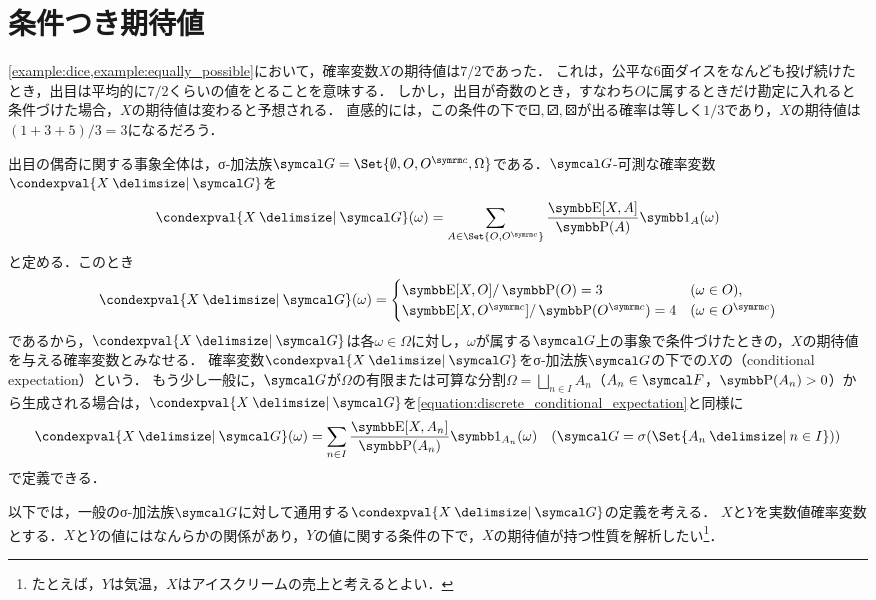 \documentclass[../../main]{subfiles}
\begin{document}
\section{条件つき期待値}

\cref{example:dice,example:equally_possible}において，確率変数\(X\)の期待値は\(7/2\)であった．
これは，公平な6面ダイスをなんども投げ続けたとき，出目は平均的に\(7/2\)くらいの値をとることを意味する．
しかし，出目が奇数のとき，すなわち\(O\)に属するときだけ勘定に入れると条件づけた場合，\(X\)の期待値は変わると予想される．
直感的には，この条件の下で\(\dicei,\diceiii,\dicev\)が出る確率は等しく\(1/3\)であり，\(X\)の期待値は\((1+3+5)/3=3\)になるだろう．

出目の偶奇に関する事象全体は，σ‐加法族\(\sigmaalg{G}=\Set{\emptyset,O,\scomp{O},\Omega}\)である．\(\sigmaalg{G}\)‐可測な確率変数\(\condexpval{X\given\sigmaalg{G}}\)を
\begin{equation}
  \label{equation:discrete_conditional_expectation}
  \condexpval{X\given\sigmaalg{G}}(\omega) = \sum_{A\in\Set{O,\scomp{O}}}\frac{\expval[X,A]}{\prob(A)}\indicator_A(\omega)
\end{equation}
と定める．このとき
\[
  \condexpval{X\given\sigmaalg{G}}(\omega) = \begin{cases}\expval[X,O]/\prob(O) = 3 & (\omega\in O),\\ \expval[X,\scomp{O}]/\prob(\scomp{O}) = 4 & (\omega\in\scomp{O})\end{cases}
\]
であるから，\(\condexpval{X\given\sigmaalg{G}}\)は各\(\omega\in\Omega\)に対し，\(\omega\)が属する\(\sigmaalg{G}\)上の事象で条件づけたときの，\(X\)の期待値を与える確率変数とみなせる．
確率変数\(\condexpval{X\given\sigmaalg{G}}\)をσ‐加法族\(\sigmaalg{G}\)の下での\(X\)の（conditional expectation）という．
もう少し一般に，\(\sigmaalg{G}\)が\(\Omega\)の有限または可算な分割\(\Omega=\bigsqcup_{n\in I}A_n\)（\(A_n\in\sigmaalg{F}\)，\(\prob(A_n)>0\)）から生成される場合は，\(\condexpval{X\given\sigmaalg{G}}\)を\cref{equation:discrete_conditional_expectation}と同様に
\begin{equation}
  \label{equation:disjoint_conditional_expectation}
  \condexpval{X\given\sigmaalg{G}}(\omega) = \sum_{n\in I}\frac{\expval[X,A_n]}{\prob(A_n)}\indicator_{A_n}(\omega)\quad(\sigmaalg{G}=\sigmagen{\Set{A_n\given n\in I}})
\end{equation}
で定義できる．

以下では，一般のσ‐加法族\(\sigmaalg{G}\)に対して通用する\(\condexpval{X\given\sigmaalg{G}}\)の定義を考える．
\(X\)と\(Y\)を実数値確率変数とする．\(X\)と\(Y\)の値にはなんらかの関係があり，\(Y\)の値に関する条件の下で，\(X\)の期待値が持つ性質を解析したい\footnote{たとえば，\(Y\)は気温，\(X\)はアイスクリームの売上と考えるとよい．}．
\end{document}
